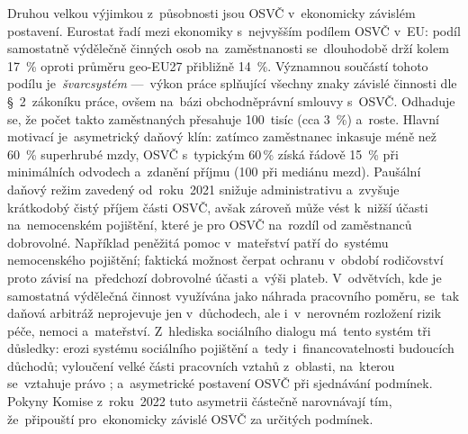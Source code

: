 Druhou velkou výjimkou z~působnosti  jsou \acs{OSVČ}
v~ekonomicky závislém postavení. Eurostat řadí  mezi ekonomiky s~nejvyšším podílem \acs{OSVČ} v~\acs{EU}: podíl samostatně výdělečně činných
osob na~zaměstnanosti se~dlouhodobě drží kolem \SI{17}{\percent} oproti
průměru \acs{geo-EU27} přibližně \SI{14}{\percent}. Významnou součástí tohoto
podílu je~\emph{švarcsystém} ---~výkon práce splňující všechny znaky závislé
činnosti dle §~2~zákoníku práce, ovšem na~bázi obchodněprávní smlouvy
s~\acs{OSVČ}. Odhaduje se, že počet takto zaměstnaných přesahuje 100~tisíc (cca 3~\%) a~roste. Hlavní motivací je~asymetrický daňový klín: zatímco zaměstnanec
inkasuje méně než \SI{60}{\percent} superhrubé mzdy, \acs{OSVČ} s~typickým 60\,\%
získá řádově \SI{15}{\percent} při minimálních odvodech a~zdanění příjmu
(\SI{100}{\czk} při mediánu mezd). Paušální daňový režim zavedený od~roku~2021 snižuje administrativu a~zvyšuje krátkodobý čistý příjem části \acs{OSVČ}, avšak zároveň může vést k~nižší účasti na~nemocenském pojištění, které je pro \acs{OSVČ} na~rozdíl od zaměstnanců dobrovolné. Například peněžitá pomoc v~mateřství patří do~systému nemocenského pojištění; faktická možnost čerpat ochranu v~období rodičovství proto závisí na~předchozí dobrovolné účasti a~výši plateb. V~odvětvích, kde je samostatná výdělečná činnost využívána jako náhrada pracovního poměru, se~tak daňová arbitráž neprojevuje jen v~důchodech, ale i~v~nerovném rozložení rizik péče, nemoci a~mateřství.
Z~hlediska sociálního dialogu má~tento systém tři důsledky: erozi systému sociálního pojištění a~tedy
i~financovatelnosti budoucích důchodů; vyloučení velké části pracovních
vztahů z~oblasti, na~kterou se~vztahuje právo ; a~asymetrické
postavení \acs{OSVČ} při sjednávání podmínek.
Pokyny Komise z~roku~2022 tuto asymetrii částečně narovnávají tím, že~připouští
 pro~ekonomicky závislé \acs{OSVČ} za určitých podmínek.~\cite{EC_Guidelines_CB_SoloSelfEmployed_2022}~\cite{CSSZ_RocenkaOSVC_2024}~\cite{PAQ_Svarcsystem}\par

